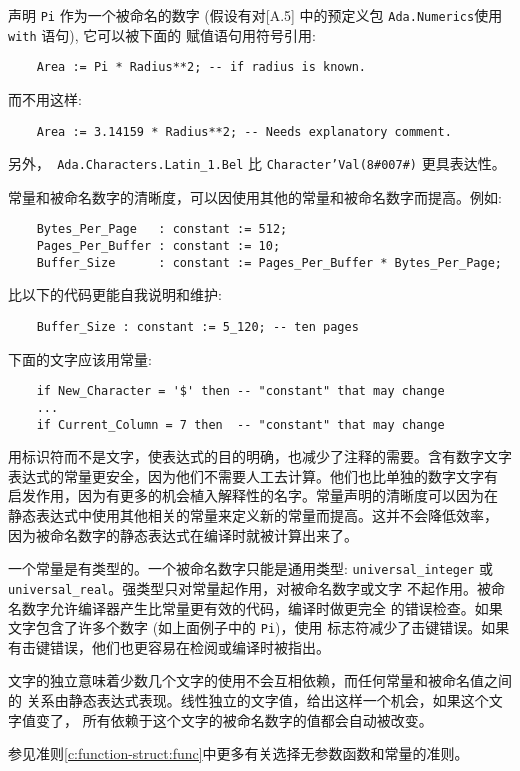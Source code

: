 声明 \texttt{Pi} 作为一个被命名的数字 (假设有对\cite{arm95}[\textsection{}A.5]
中的预定义包 \texttt{Ada.Numerics}使用\texttt{with} 语句), 它可以被下面的
赋值语句用符号引用:
\begin{lstlisting}
    Area := Pi * Radius**2; -- if radius is known.
\end{lstlisting}
而不用这样:
\begin{lstlisting}
    Area := 3.14159 * Radius**2; -- Needs explanatory comment.
\end{lstlisting}

另外，\texttt{ Ada.Characters.Latin\_1.Bel} 比 \texttt{Character'Val(8\#007\#)}
更具表达性。

常量和被命名数字的清晰度，可以因使用其他的常量和被命名数字而提高。例如:
\begin{lstlisting}
    Bytes_Per_Page   : constant := 512;
    Pages_Per_Buffer : constant := 10;
    Buffer_Size      : constant := Pages_Per_Buffer * Bytes_Per_Page;
\end{lstlisting}
比以下的代码更能自我说明和维护:
\begin{lstlisting}
    Buffer_Size : constant := 5_120; -- ten pages
\end{lstlisting}

下面的文字应该用常量:
\begin{lstlisting}
    if New_Character = '$' then -- "constant" that may change
    ...
    if Current_Column = 7 then  -- "constant" that may change
\end{lstlisting}


\begin{blockindent}
用标识符而不是文字，使表达式的目的明确，也减少了注释的需要。含有数字文字
表达式的常量更安全，因为他们不需要人工去计算。他们也比单独的数字文字有
启发作用，因为有更多的机会植入解释性的名字。常量声明的清晰度可以因为在
静态表达式中使用其他相关的常量来定义新的常量而提高。这并不会降低效率，
因为被命名数字的静态表达式在编译时就被计算出来了。

一个常量是有类型的。一个被命名数字只能是通用类型: \texttt{universal\_integer}
或 \texttt{universal\_real}。强类型只对常量起作用，对被命名数字或文字
不起作用。被命名数字允许编译器产生比常量更有效的代码，编译时做更完全
的错误检查。如果文字包含了许多个数字 (如上面例子中的 \texttt{Pi})，使用
标志符减少了击键错误。如果有击键错误，他们也更容易在检阅或编译时被指出。

文字的独立意味着少数几个文字的使用不会互相依赖，而任何常量和被命名值之间的
关系由静态表达式表现。线性独立的文字值，给出这样一个机会，如果这个文字值变了，
所有依赖于这个文字的被命名数字的值都会自动被改变。

参见准则\ref{c:function-struct:func}中更多有关选择无参数函数和常量的准则。
\end{blockindent}


